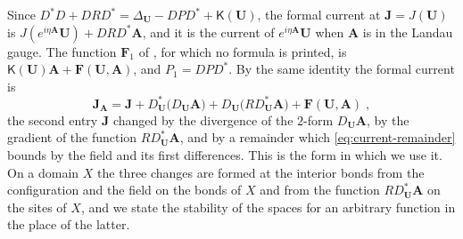 \documentclass[11pt]{preprint}
\numberwithin{equation}{section}
\begin{document}
Since $D^*D + DRD^* = \Delta_{\mathbf U} - DPD^* + \mathsf K(\mathbf U)$, the formal current at $\mathbf J = J(\mathbf U)$ is $J(e^{i\eta\mathbf A}\mathbf U) + DRD^*\mathbf A$, and it is the current of $e^{i\eta\mathbf A}\mathbf U$ when $\mathbf A$ is in the Landau gauge. The function $\mathbf F_1$ of \cite[(3.13)]{BalabanRG1}, for which no formula is printed, is $\mathsf K(\mathbf U)\mathbf A + \mathbf F(\mathbf U, \mathbf A)$, and $P_1 = DPD^*$. By the same identity the formal current is
\begin{equation}\label{eq:formal-current-divergence}
    \mathbf J_{\mathbf A} = \mathbf J + D^*_{\mathbf U}\bigl(D_{\mathbf U}\mathbf A\bigr) + D_{\mathbf U}\bigl(RD^*_{\mathbf U}\mathbf A\bigr) + \mathbf F(\mathbf U, \mathbf A)\;,
\end{equation}
the second entry $\mathbf J$ changed by the divergence of the $2$-form $D_{\mathbf U}\mathbf A$, by the gradient of the function $RD^*_{\mathbf U}\mathbf A$, and by a remainder which \eqref{eq:current-remainder} bounds by the field and its first differences. This is the form in which we use it. On a domain $X$ the three changes are formed at the interior bonds from the configuration and the field on the bonds of $X$ and from the function $RD^*_{\mathbf U}\mathbf A$ on the sites of $X$, and we state the stability of the spaces for an arbitrary function in the place of the latter.
\end{document}
